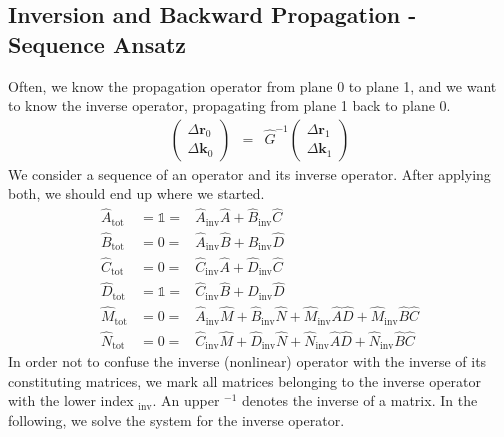 \documentclass[12pt,a4paper,twoside,openright,BCOR10mm,headsepline,titlepage,abstracton,chapterprefix,final]{scrreprt}
\newcommand\Vector[1]{{\mathbf{#1}}}
\newcommand\wavenumber{k}
\newcommand\Wavevector{\Vector{\wavenumber}}
\newcommand\unittensor{\mathds{1}}
\newcommand\tot{\textrm{tot}}
\begin{document}
\subsection{Inversion and Backward Propagation - Sequence Ansatz}
Often, we know the propagation operator from plane 0 to plane 1, and we want to know the inverse operator,
propagating from plane 1 back to plane 0.
\begin{eqnarray}
 \begin{pmatrix}
  \Delta \Vector{r}_{0} \\ \Delta \Wavevector_{0}
 \end{pmatrix}
 &=&
 \hat{G}^{-1}
 \begin{pmatrix}
  \Delta \Vector{r}_{1} \\ \Delta \Wavevector_{1}
 \end{pmatrix}
\end{eqnarray}
We consider a sequence of an operator and its inverse operator.
After applying both, we should end up where we started.
\begin{subequations}
\begin{eqnarray}
 \hat{A}_\tot &= \unittensor =& \hat{A}_{\text{inv}} \hat{A} + \hat{B}_{\text{inv}} \hat{C} \\
 \hat{B}_\tot &= 0           =& \hat{A}_{\text{inv}} \hat{B} + \hat{B}_{\text{inv}} \hat{D} \\
 \hat{C}_\tot &= 0           =& \hat{C}_{\text{inv}} \hat{A} + \hat{D}_{\text{inv}} \hat{C}\\
 \hat{D}_\tot &= \unittensor =& \hat{C}_{\text{inv}} \hat{B} + \hat{D}_{\text{inv}} \hat{D} \\
 \hat{M}_\tot &= 0           =& \hat{A}_{\text{inv}} \hat{M} + \hat{B}_{\text{inv}} \hat{N} + \hat{M}_{\text{inv}} \hat{A} \hat{D} + \hat{M}_{\text{inv}} \hat{B} \hat{C} \\
 \hat{N}_\tot &= 0           =& \hat{C}_{\text{inv}} \hat{M} + \hat{D}_{\text{inv}} \hat{N} + \hat{N}_{\text{inv}} \hat{A} \hat{D} + \hat{N}_{\text{inv}} \hat{B} \hat{C}
\end{eqnarray}
\end{subequations}
In order not to confuse the inverse (nonlinear) operator with the inverse of its constituting matrices,
we mark all matrices belonging to the inverse operator with the lower index $_\text{inv}$.
An upper $^{-1}$ denotes the inverse of a matrix.
In the following, we solve the system for the inverse operator.
\end{document}
